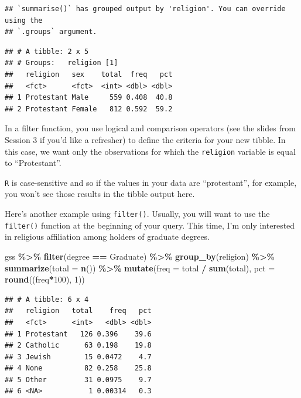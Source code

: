 \documentclass[
]{book}
\newenvironment{Shaded}{\begin{snugshade}}{\end{snugshade}}
\newcommand{\AttributeTok}[1]{\textcolor[rgb]{0.13,0.29,0.53}{#1}}
\newcommand{\DecValTok}[1]{\textcolor[rgb]{0.00,0.00,0.81}{#1}}
\newcommand{\FunctionTok}[1]{\textcolor[rgb]{0.13,0.29,0.53}{\textbf{#1}}}
\newcommand{\NormalTok}[1]{#1}
\newcommand{\SpecialCharTok}[1]{\textcolor[rgb]{0.81,0.36,0.00}{\textbf{#1}}}
\newcommand{\StringTok}[1]{\textcolor[rgb]{0.31,0.60,0.02}{#1}}
\begin{document}
\begin{verbatim}
## `summarise()` has grouped output by 'religion'. You can override using the
## `.groups` argument.
\end{verbatim}

\begin{verbatim}
## # A tibble: 2 x 5
## # Groups:   religion [1]
##   religion   sex    total  freq   pct
##   <fct>      <fct>  <int> <dbl> <dbl>
## 1 Protestant Male     559 0.408  40.8
## 2 Protestant Female   812 0.592  59.2
\end{verbatim}

In a filter function, you use logical and comparison operators (see the slides from Session 3 if you'd like a refresher) to define the criteria for your new tibble. In this case, we want only the observations for which the \texttt{religion} variable is equal to ``Protestant''.

\texttt{R} is case-sensitive and so if the values in your data are ``protestant'', for example, you won't see those results in the tibble output here.

Here's another example using \texttt{filter()}. Usually, you will want to use the \texttt{filter()} function at the beginning of your query. This time, I'm only interested in religious affiliation among holders of graduate degrees.

\begin{Shaded}
\begin{Highlighting}[]
\NormalTok{gss }\SpecialCharTok{\%\textgreater{}\%}
  \FunctionTok{filter}\NormalTok{(degree }\SpecialCharTok{==} \StringTok{\textquotesingle{}Graduate\textquotesingle{}}\NormalTok{) }\SpecialCharTok{\%\textgreater{}\%}
  \FunctionTok{group\_by}\NormalTok{(religion) }\SpecialCharTok{\%\textgreater{}\%}
  \FunctionTok{summarize}\NormalTok{(}\AttributeTok{total =} \FunctionTok{n}\NormalTok{()) }\SpecialCharTok{\%\textgreater{}\%}
  \FunctionTok{mutate}\NormalTok{(}\AttributeTok{freq =}\NormalTok{ total }\SpecialCharTok{/} \FunctionTok{sum}\NormalTok{(total),}
         \AttributeTok{pct =} \FunctionTok{round}\NormalTok{((freq}\SpecialCharTok{*}\DecValTok{100}\NormalTok{), }\DecValTok{1}\NormalTok{))}
\end{Highlighting}
\end{Shaded}

\begin{verbatim}
## # A tibble: 6 x 4
##   religion   total    freq   pct
##   <fct>      <int>   <dbl> <dbl>
## 1 Protestant   126 0.396    39.6
## 2 Catholic      63 0.198    19.8
## 3 Jewish        15 0.0472    4.7
## 4 None          82 0.258    25.8
## 5 Other         31 0.0975    9.7
## 6 <NA>           1 0.00314   0.3
\end{verbatim}
\end{document}
